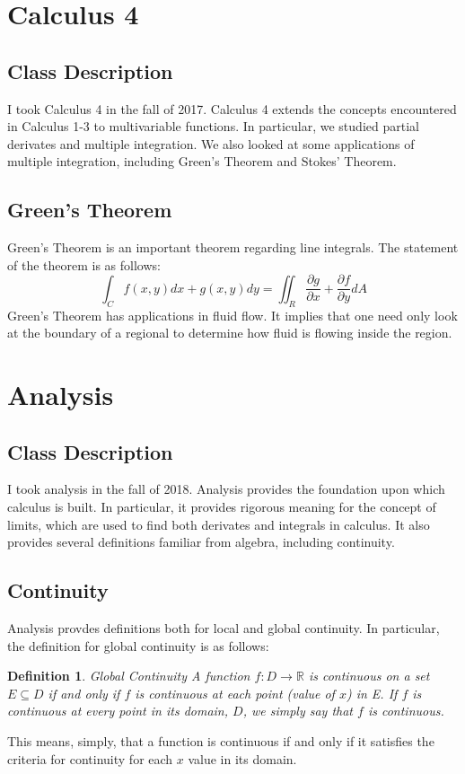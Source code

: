 \documentclass[12pt]{article}
\title{Prompt #4: Using BiBTeX}
\author{Eric Genheimer}
\date{September 26, 2019}
\newtheorem{definition}{Definition}
\begin{document}
\maketitle
\newpage

\section{Calculus 4}
\subsection{Class Description}
I took Calculus 4 in the fall of 2017. Calculus 4 extends the concepts encountered in Calculus 1-3 to multivariable functions. In particular, we studied partial derivates and multiple integration. We also looked at some applications of multiple integration, including Green's Theorem and Stokes' Theorem.
\subsection{Green's Theorem}
Green's Theorem is an important theorem regarding line integrals. The statement of the theorem is as follows:
\[\int_{C}{}f(x,y)dx + g(x,y)dy=\iint_{R}{}\frac{\partial g}{\partial x}+\frac{\partial f}{\partial y}dA \]%
Green's Theorem has applications in fluid flow. It implies that one need only look at the boundary of a regional to determine how fluid is flowing inside the region.\cite{anton2016calculus}
\section{Analysis}
\subsection{Class Description}
I took analysis in the fall of 2018. Analysis provides the foundation upon which calculus is built. In particular, it provides rigorous meaning for the concept of limits, which are used to find both derivates and integrals in calculus. It also provides several definitions familiar from algebra, including continuity.
\subsection{Continuity}
Analysis provdes definitions both for local and global continuity. In particular, the definition for global continuity is as follows:
\begin{center}
\begin{definition}{Global Continuity}
A function $f:D\rightarrow \mathbb{R}$ is \emph{continuous on a set $E \subseteq D$} if and only if $f$ is continuous at each point (value of $x$) in E. If $f$ is continuous at every point in its domain, $D$, we simply say that $f$ is \emph{continuous}.
\cite{kosmala2004friendly}
\end{definition}
\end{center}
This means, simply, that a function is continuous if and only if it satisfies the criteria for continuity for each \(x\) value in its domain. 
\end{document}
